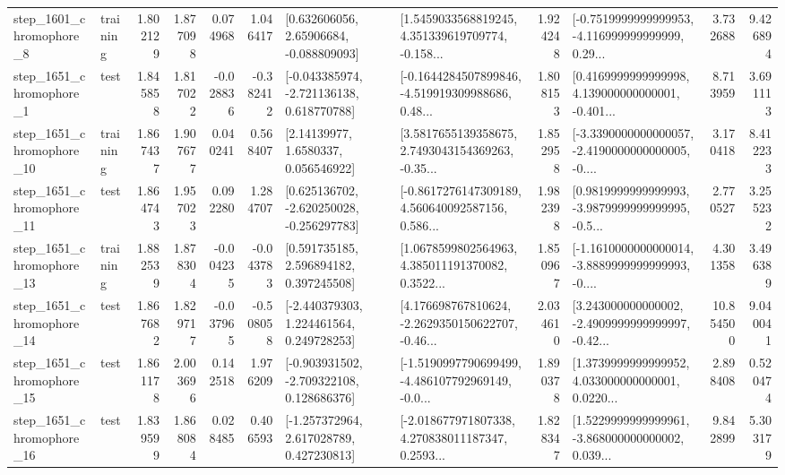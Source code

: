 \begin{tabular}{llrrrrllrlrr}
  step\_1601\_chromophore\_8 &  training &      1.802129 &    1.877098 &      0.074968 &  1.046417 &     [0.632606056, 2.65906684, -0.088809093] &  [1.5459033568819245, 4.351339619709774, -0.158... &       1.924248 &  [-0.7519999999999953, -4.116999999999999, 0.29... &            3.732688 &          9.426894 \\
  step\_1651\_chromophore\_1 &      test &      1.845858 &    1.817022 &     -0.028836 & -0.382412 &   [-0.043385974, -2.721136138, 0.618770788] &  [-0.1644284507899846, -4.519919309988686, 0.48... &       1.808153 &  [0.4169999999999998, 4.139000000000001, -0.401... &            8.713959 &          3.691113 \\
 step\_1651\_chromophore\_10 &  training &      1.867437 &    1.907677 &      0.040241 &  0.568407 &        [2.14139977, 1.6580337, 0.056546922] &  [3.5817655139358675, 2.7493043154369263, -0.35... &       1.852958 &  [-3.3390000000000057, -2.4190000000000005, -0.... &            3.170418 &          8.412233 \\
 step\_1651\_chromophore\_11 &      test &      1.864743 &    1.957023 &      0.092280 &  1.284707 &   [0.625136702, -2.620250028, -0.256297783] &  [-0.8617276147309189, 4.560640092587156, 0.586... &       1.982398 &  [0.9819999999999993, -3.9879999999999995, -0.5... &            2.770527 &          3.255232 \\
 step\_1651\_chromophore\_13 &  training &      1.882539 &    1.878304 &     -0.004235 & -0.043783 &     [0.591735185, 2.596894182, 0.397245508] &  [1.0678599802564963, 4.385011191370082, 0.3522... &       1.850967 &  [-1.1610000000000014, -3.8889999999999993, -0.... &            4.301358 &          3.496389 \\
 step\_1651\_chromophore\_14 &      test &      1.867682 &    1.829717 &     -0.037965 & -0.508058 &    [-2.440379303, 1.224461564, 0.249728253] &  [4.176698767810624, -2.2629350150622707, -0.46... &       2.034610 &  [3.243000000000002, -2.4909999999999997, -0.42... &           10.854500 &          9.040041 \\
 step\_1651\_chromophore\_15 &      test &      1.861178 &    2.003696 &      0.142518 &  1.976209 &   [-0.903931502, -2.709322108, 0.128686376] &  [-1.5190997790699499, -4.486107792969149, -0.0... &       1.890378 &  [1.3739999999999952, 4.033000000000001, 0.0220... &            2.898408 &          0.520474 \\
 step\_1651\_chromophore\_16 &      test &      1.839599 &    1.868084 &      0.028485 &  0.406593 &    [-1.257372964, 2.617028789, 0.427230813] &  [-2.018677971807338, 4.270838011187347, 0.2593... &       1.828347 &  [1.5229999999999961, -3.868000000000002, 0.039... &            9.842899 &          5.303179 \\

\end{tabular}
